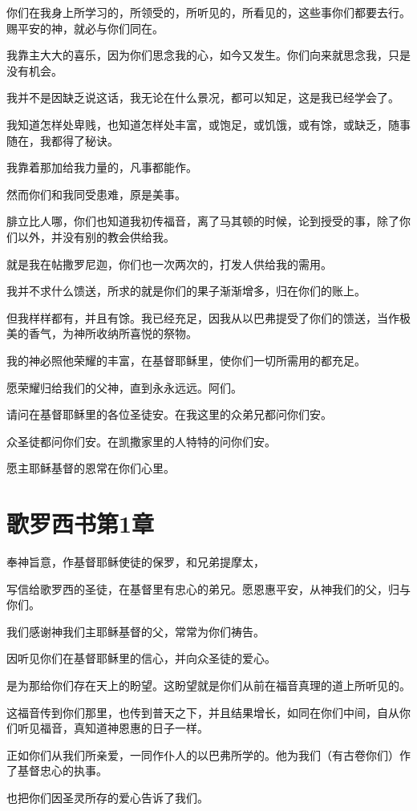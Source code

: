\documentclass[12pt,oneside]{book}
\begin{document}
你们在我身上所学习的，所领受的，所听见的，所看见的，这些事你们都要去行。赐平安的神，就必与你们同在。

我靠主大大的喜乐，因为你们思念我的心，如今又发生。你们向来就思念我，只是没有机会。

我并不是因缺乏说这话，我无论在什么景况，都可以知足，这是我已经学会了。

我知道怎样处卑贱，也知道怎样处丰富，或饱足，或饥饿，或有馀，或缺乏，随事随在，我都得了秘诀。

我靠着那加给我力量的，凡事都能作。

然而你们和我同受患难，原是美事。

腓立比人哪，你们也知道我初传福音，离了马其顿的时候，论到授受的事，除了你们以外，并没有别的教会供给我。

就是我在帖撒罗尼迦，你们也一次两次的，打发人供给我的需用。

我并不求什么馈送，所求的就是你们的果子渐渐增多，归在你们的账上。

但我样样都有，并且有馀。我已经充足，因我从以巴弗提受了你们的馈送，当作极美的香气，为神所收纳所喜悦的祭物。

我的神必照他荣耀的丰富，在基督耶稣里，使你们一切所需用的都充足。

愿荣耀归给我们的父神，直到永永远远。阿们。

请问在基督耶稣里的各位圣徒安。在我这里的众弟兄都问你们安。

众圣徒都问你们安。在凯撒家里的人特特的问你们安。

愿主耶稣基督的恩常在你们心里。

\chapter{歌罗西书第1章}
奉神旨意，作基督耶稣使徒的保罗，和兄弟提摩太，

写信给歌罗西的圣徒，在基督里有忠心的弟兄。愿恩惠平安，从神我们的父，归与你们。

我们感谢神我们主耶稣基督的父，常常为你们祷告。

因听见你们在基督耶稣里的信心，并向众圣徒的爱心。

是为那给你们存在天上的盼望。这盼望就是你们从前在福音真理的道上所听见的。

这福音传到你们那里，也传到普天之下，并且结果增长，如同在你们中间，自从你们听见福音，真知道神恩惠的日子一样。

正如你们从我们所亲爱，一同作仆人的以巴弗所学的。他为我们（有古卷你们）作了基督忠心的执事。

也把你们因圣灵所存的爱心告诉了我们。
\end{document}
